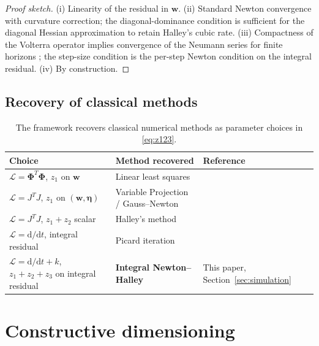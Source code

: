 \documentclass[preprint,12pt,numbers]{elsarticle}
\begin{document}
\begin{proof}[Proof sketch]
(i) Linearity of the residual in $\mathbf{w}$.
(ii) Standard Newton convergence with curvature correction; the
diagonal-dominance condition is sufficient for the diagonal Hessian
approximation to retain Halley's cubic rate.
(iii) Compactness of the Volterra operator implies convergence of the
Neumann series for finite horizons \cite{Kress2014}; the step-size
condition is the per-step Newton condition on the integral residual.
(iv) By construction.
\end{proof}

\subsection{Recovery of classical methods}

\begin{table}[h]
\centering
\caption{The framework recovers classical numerical methods as parameter
choices in \eqref{eq:z123}.}
\label{tab:connections}
\begin{tabular}{L{4.0cm} L{3.5cm} L{4.5cm}}
\toprule
\textbf{Choice} & \textbf{Method recovered} & \textbf{Reference} \\
\midrule
$\mathcal{L} = \boldsymbol{\Phi}^T\boldsymbol{\Phi}$, $z_1$ on $\mathbf{w}$ &
Linear least squares & \citet{Bjorck1996} \\
$\mathcal{L} = J^TJ$, $z_1$ on $(\mathbf{w}, \boldsymbol{\eta})$ &
Variable Projection / Gauss--Newton & \citet{GolubPereyra1973,Sjolund2014} \\
$\mathcal{L} = J^TJ$, $z_1 + z_2$ scalar &
Halley's method & \citet{Gutierrez1997} \\
$\mathcal{L} = \mathrm{d}/\mathrm{d}t$, integral residual &
Picard iteration & \citet{Atkinson1997} \\
$\mathcal{L} = \mathrm{d}/\mathrm{d}t + k$, $z_1+z_2+z_3$ on integral residual &
\textbf{Integral Newton--Halley} & This paper, Section~\ref{sec:simulation} \\
\bottomrule
\end{tabular}
\end{table}


\section{Constructive dimensioning}
\label{sec:dimensioning}
\end{document}
